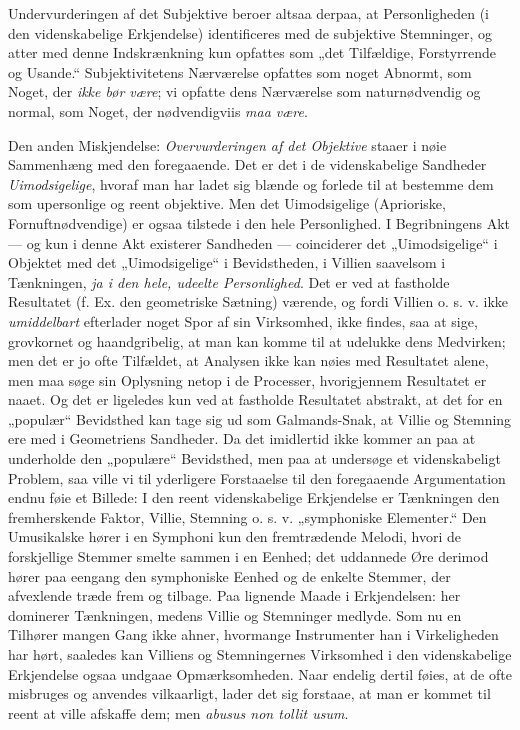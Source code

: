 \documentclass[12pt,a4paper]{book}
\newcommand{\opage}[1]{\marginnote{\footnotesize\textit{[#1]}}}
\begin{document}
Undervurderingen af det Subjektive beroer altsaa
derpaa, at Personligheden (i den videnskabelige Erkjendelse)
identificeres med de subjektive Stemninger, og
atter med denne Indskrænkning kun opfattes som „det
Tilfældige, Forstyrrende og Usande.“ Subjektivitetens
Nærværelse opfattes som noget Abnormt, som Noget,
der \emph{ikke bør være}; vi opfatte dens Nærværelse som
naturnødvendig og normal, som Noget, der nødvendigviis
\emph{maa være}.

Den anden Miskjendelse: \emph{Overvurderingen af
det Objektive} staaer i nøie Sammenhæng med den
foregaaende. Det er det i de videnskabelige Sandheder
\emph{Uimodsigelige}, hvoraf man har ladet sig blænde og
forlede til at bestemme dem som upersonlige og reent objektive.
Men det Uimodsigelige (Aprioriske, Fornuftnødvendige)
er ogsaa tilstede i den hele Personlighed. I
Begribningens Akt --- og kun i denne Akt existerer
Sandheden --- coinciderer det „Uimodsigelige“ i Objektet
med det „Uimodsigelige“ i Bevidstheden, i Villien
saavelsom i Tænkningen, \emph{ja i den hele, udeelte Personlighed}.
Det er ved at fastholde Resultatet (f. Ex.
den geometriske Sætning) værende, og fordi Villien o. s. v.
ikke \emph{umiddelbart} efterlader noget Spor af sin Virksomhed,
ikke findes, saa at sige, grovkornet og haandgribelig, at
man kan komme til at udelukke dens Medvirken; men det er
\opage{26}\setcounter{footnote}{0}%
jo ofte Tilfældet, at Analysen ikke kan nøies med Resultatet
alene, men maa søge sin Oplysning netop i
de Processer, hvorigjennem Resultatet er naaet. Og
det er ligeledes kun ved at fastholde Resultatet abstrakt,
at det for en „populær“ Bevidsthed kan tage sig ud
som Galmands-Snak, at Villie og Stemning ere med
i Geometriens Sandheder. Da det imidlertid ikke kommer
an paa at underholde den „populære“ Bevidsthed,
men paa at undersøge et videnskabeligt Problem, saa ville
vi til yderligere Forstaaelse til den foregaaende Argumentation
endnu føie et Billede: I den reent videnskabelige
Erkjendelse er Tænkningen den fremherskende Faktor,
Villie, Stemning o. s. v. „symphoniske Elementer.“
Den Umusikalske hører i en Symphoni kun den fremtrædende
Melodi, hvori de forskjellige Stemmer smelte
sammen i en Eenhed; det uddannede Øre derimod hører
paa eengang den symphoniske Eenhed og de enkelte Stemmer,
der afvexlende træde frem og tilbage. Paa lignende
Maade i Erkjendelsen: her dominerer Tænkningen, medens
Villie og Stemninger medlyde. Som nu en Tilhører
mangen Gang ikke ahner, hvormange Instrumenter
han i Virkeligheden har hørt, saaledes kan Villiens og
Stemningernes Virksomhed i den videnskabelige Erkjendelse
ogsaa undgaae Opmærksomheden. Naar endelig
dertil føies, at de ofte misbruges og anvendes vilkaarligt,
lader det sig forstaae, at man er kommet til reent
at ville afskaffe dem; men \textit{abusus non tollit usum}.
\end{document}

